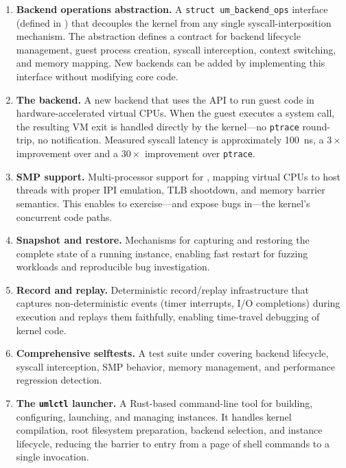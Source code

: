 \begin{enumerate}[leftmargin=2em]
  \item \textbf{Backend operations abstraction.}
    A \texttt{struct um\_backend\_ops} interface
    (defined in )
    that decouples the \UML{} kernel from any single syscall-interposition
    mechanism.  The abstraction defines a contract for backend lifecycle
    management, guest process creation, syscall interception, context switching,
    and memory mapping.  New backends can be added by implementing this
    interface without modifying core \UML{} code.

  \item \textbf{The \KVMvTwo{} backend.}
    A new backend that uses the \KVM{} API to run \UML{} guest code in
    hardware-accelerated virtual CPUs.  When the guest executes a system call,
    the resulting VM exit is handled directly by the \UML{} kernel---no
    \texttt{ptrace} round-trip, no \Seccomp{} notification.  Measured syscall
    latency is approximately \SI{100}{\nano\second}, a $3\times$ improvement
    over \Seccomp{} and a $30\times$ improvement over \texttt{ptrace}.

  \item \textbf{SMP support.}
    Multi-processor support for \UML{}, mapping virtual CPUs to host threads
    with proper IPI emulation, TLB shootdown, and memory barrier semantics.
    This enables \UML{} to exercise---and expose bugs in---the kernel's
    concurrent code paths.

  \item \textbf{Snapshot and restore.}
    Mechanisms for capturing and restoring the complete state of a running
    \UML{} instance, enabling fast restart for fuzzing workloads and
    reproducible bug investigation.

  \item \textbf{Record and replay.}
    Deterministic record/replay infrastructure that captures non-deterministic
    events (timer interrupts, I/O completions) during execution and replays
    them faithfully, enabling time-travel debugging of kernel code.

  \item \textbf{Comprehensive selftests.}
    A test suite under  covering backend
    lifecycle, syscall interception, SMP behavior, memory management, and
    performance regression detection.

  \item \textbf{The \texttt{umlctl} launcher.}
    A Rust-based command-line tool for building, configuring, launching, and
    managing \UML{} instances.  It handles kernel compilation, root filesystem
    preparation, backend selection, and instance lifecycle, reducing the barrier
    to entry from a page of shell commands to a single invocation.
\end{enumerate}

